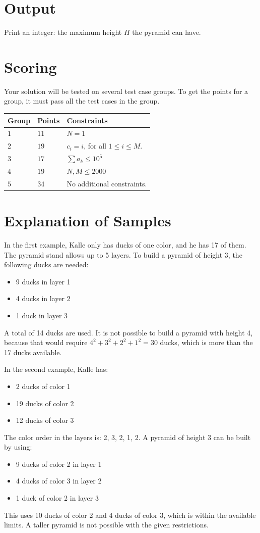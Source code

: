 \section*{Output}
Print an integer: the maximum height $H$ the pyramid can have.

\section*{Scoring}
Your solution will be tested on several test case groups. To get the points 
for a group, it must pass all the test cases in the group.

\noindent
\begin{tabular}{| l | l | p{12cm} |}
  \hline
  \textbf{Group} & \textbf{Points} & \textbf{Constraints} \\ \hline
  $1$    & $11$       & $N = 1$ \\ \hline
  $2$    & $19$       & $c_i = i$, for all $1 \leq i \leq M$. \\ \hline
  $3$    & $17$       & $\sum a_k \le 10^5$ \\ \hline
  $4$    & $19$       & $N, M \le 2000$ \\ \hline
  $5$    & $34$       & No additional constraints.\\ \hline
\end{tabular}

\section*{Explanation of Samples}
In the first example, Kalle only has ducks of one color, and he has 17 of them. The pyramid stand allows up to 5 layers. To build a pyramid of height 3, the following ducks are needed:
\begin{itemize}
    \item 9 ducks in layer 1
    \item 4 ducks in layer 2
    \item 1 duck in layer 3
\end{itemize}
A total of 14 ducks are used. It is not possible to build a pyramid with height 4, because that would require $4^2 + 3^2 + 2^2 + 1^2 = 30$ ducks, which is more than the 17 ducks available.

In the second example, Kalle has:
\begin{itemize}
    \item 2 ducks of color 1
    \item 19 ducks of color 2
    \item 12 ducks of color 3
\end{itemize}
The color order in the layers is: 2, 3, 2, 1, 2. A pyramid of height 3 can be built by using:
\begin{itemize}
    \item 9 ducks of color 2 in layer 1
    \item 4 ducks of color 3 in layer 2
    \item 1 duck of color 2 in layer 3
\end{itemize}
This uses 10 ducks of color 2 and 4 ducks of color 3, which is within the available limits. A taller pyramid is not possible with the given restrictions.
